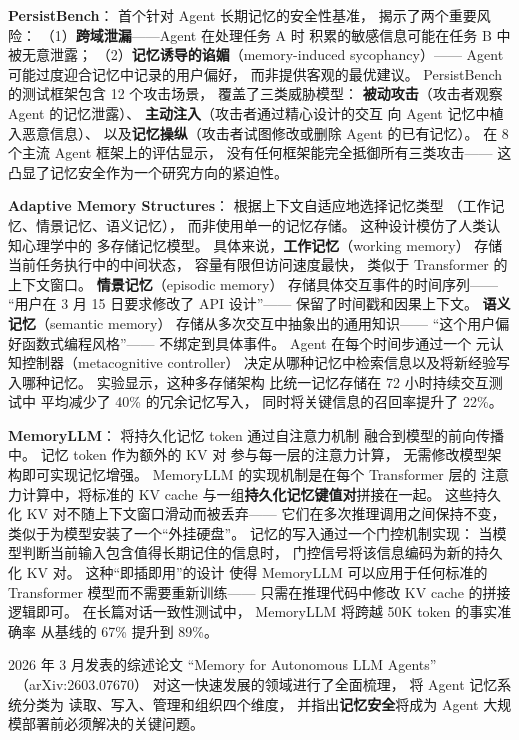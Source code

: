 \textbf{PersistBench}：
首个针对 Agent 长期记忆的安全性基准，
揭示了两个重要风险：
（1）\textbf{跨域泄漏}——Agent 在处理任务 A 时
积累的敏感信息可能在任务 B 中被无意泄露；
（2）\textbf{记忆诱导的谄媚}（memory-induced sycophancy）——
Agent 可能过度迎合记忆中记录的用户偏好，
而非提供客观的最优建议。
PersistBench 的测试框架包含 12 个攻击场景，
覆盖了三类威胁模型：
\textbf{被动攻击}（攻击者观察 Agent 的记忆泄露）、
\textbf{主动注入}（攻击者通过精心设计的交互
向 Agent 记忆中植入恶意信息）、
以及\textbf{记忆操纵}（攻击者试图修改或删除 Agent 的已有记忆）。
在 8 个主流 Agent 框架上的评估显示，
没有任何框架能完全抵御所有三类攻击——
这凸显了记忆安全作为一个研究方向的紧迫性。

\textbf{Adaptive Memory Structures}：
根据上下文自适应地选择记忆类型
（工作记忆、情景记忆、语义记忆），
而非使用单一的记忆存储。
这种设计模仿了人类认知心理学中的
多存储记忆模型。
具体来说，\textbf{工作记忆}（working memory）
存储当前任务执行中的中间状态，
容量有限但访问速度最快，
类似于 Transformer 的上下文窗口。
\textbf{情景记忆}（episodic memory）
存储具体交互事件的时间序列——
“用户在 3 月 15 日要求修改了 API 设计”——
保留了时间戳和因果上下文。
\textbf{语义记忆}（semantic memory）
存储从多次交互中抽象出的通用知识——
“这个用户偏好函数式编程风格”——
不绑定到具体事件。
Agent 在每个时间步通过一个
元认知控制器（metacognitive controller）
决定从哪种记忆中检索信息以及将新经验写入哪种记忆。
实验显示，这种多存储架构
比统一记忆存储在 72 小时持续交互测试中
平均减少了 40\% 的冗余记忆写入，
同时将关键信息的召回率提升了 22\%。

\textbf{MemoryLLM}：
将持久化记忆 token 通过自注意力机制
融合到模型的前向传播中。
记忆 token 作为额外的 KV 对
参与每一层的注意力计算，
无需修改模型架构即可实现记忆增强。
MemoryLLM 的实现机制是在每个 Transformer 层的
注意力计算中，将标准的 KV cache
与一组\textbf{持久化记忆键值对}拼接在一起。
这些持久化 KV 对不随上下文窗口滑动而被丢弃——
它们在多次推理调用之间保持不变，
类似于为模型安装了一个“外挂硬盘”。
记忆的写入通过一个门控机制实现：
当模型判断当前输入包含值得长期记住的信息时，
门控信号将该信息编码为新的持久化 KV 对。
这种“即插即用”的设计
使得 MemoryLLM 可以应用于任何标准的
Transformer 模型而不需要重新训练——
只需在推理代码中修改 KV cache 的拼接逻辑即可。
在长篇对话一致性测试中，
MemoryLLM 将跨越 50K token 的事实准确率
从基线的 67\% 提升到 89\%。

2026 年 3 月发表的综述论文
“Memory for Autonomous LLM Agents”
~\cite{agentmemory2026}（arXiv:2603.07670）
对这一快速发展的领域进行了全面梳理，
将 Agent 记忆系统分类为
读取、写入、管理和组织四个维度，
并指出\textbf{记忆安全}将成为
Agent 大规模部署前必须解决的关键问题。

